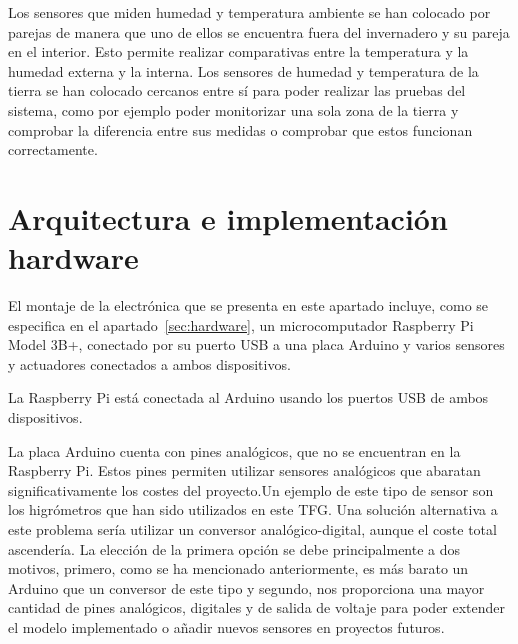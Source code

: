 \documentclass[a4paper, 12pt, oneside]{book}
\begin{document}
Los sensores que miden humedad y temperatura ambiente se han colocado por parejas de manera que uno de ellos se encuentra fuera del invernadero y su pareja en el interior. Esto permite realizar comparativas entre la temperatura y la humedad externa y la interna. Los sensores de humedad y temperatura de la tierra se han colocado cercanos entre sí para poder realizar las pruebas del sistema, como por ejemplo poder monitorizar una sola zona de la tierra y comprobar la diferencia entre sus medidas o comprobar que estos funcionan correctamente.    

\section{Arquitectura e implementación hardware}
\label{sec:Arquitectura e implementación hardware}
El montaje de la electrónica que se presenta en este apartado incluye, como se especifica en el apartado~\ref{sec:hardware}, un microcomputador Raspberry Pi Model 3B+, conectado por su puerto USB a una placa Arduino y varios sensores y actuadores conectados a ambos dispositivos.

La Raspberry Pi está conectada al Arduino usando los puertos USB de ambos dispositivos.
%

La placa Arduino cuenta con pines analógicos, que no se encuentran en la Raspberry Pi. Estos pines permiten utilizar sensores analógicos que abaratan significativamente los costes del proyecto.Un ejemplo de este tipo de sensor son los higrómetros que han sido utilizados en este TFG. Una solución alternativa a este problema sería utilizar un conversor analógico-digital, aunque el coste total ascendería. La elección de la primera opción se debe principalmente a dos motivos, primero, como se ha mencionado anteriormente, es más barato un Arduino que un conversor de este tipo y segundo, nos proporciona una mayor cantidad de pines analógicos, digitales y de salida de voltaje para poder extender el modelo implementado o añadir nuevos sensores en proyectos futuros.
\end{document}
